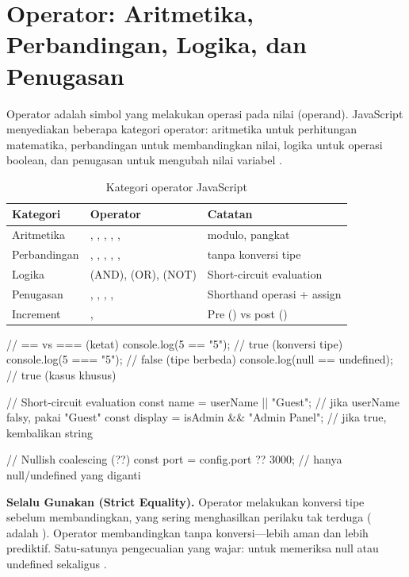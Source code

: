 \section{Operator: Aritmetika, Perbandingan, Logika, dan Penugasan}

Operator adalah simbol yang melakukan operasi pada nilai (operand). JavaScript menyediakan beberapa kategori operator: aritmetika untuk perhitungan matematika, perbandingan untuk membandingkan nilai, logika untuk operasi boolean, dan penugasan untuk mengubah nilai variabel \cite{jsInfo}.

\begin{table}[htbp]
\centering
\begin{tabular}{|P{2.5cm}|P{4.5cm}|P{5cm}|}
\hline
\textbf{Kategori} & \textbf{Operator} & \textbf{Catatan} \\
\hline
Aritmetika & \code{+}, \code{-}, \code{*}, \code{/}, \code{\%}, \code{**} & \code{\%} modulo, \code{**} pangkat \\
\hline
Perbandingan & \code{==}, \code{===}, \code{!=}, \code{!==}, \code{<}, \code{>} & \code{===} tanpa konversi tipe \\
\hline
Logika & \code{\&\&} (AND), \code{||} (OR), \code{!} (NOT) & Short-circuit evaluation \\
\hline
Penugasan & \code{=}, \code{+=}, \code{-=}, \code{*=}, \code{/=} & Shorthand operasi + assign \\
\hline
Increment & \code{++}, \code{--} & Pre () vs post () \\
\hline
\end{tabular}
\caption{Kategori operator JavaScript}
\end{table}

\begin{webcode}[language=JavaScript, caption={Operator perbandingan dan logika}]
// == vs === (ketat)
console.log(5 == "5");    // true  (konversi tipe)
console.log(5 === "5");   // false (tipe berbeda)
console.log(null == undefined); // true (kasus khusus)

// Short-circuit evaluation
const name = userName || "Guest"; // jika userName falsy, pakai "Guest"
const display = isAdmin && "Admin Panel"; // jika true, kembalikan string

// Nullish coalescing (??)
const port = config.port ?? 3000; // hanya null/undefined yang diganti
\end{webcode}

\begin{konsep}
\textbf{Selalu Gunakan \code{===} (Strict Equality).} Operator \code{==} melakukan konversi tipe sebelum membandingkan, yang sering menghasilkan perilaku tak terduga ( adalah ). Operator \code{===} membandingkan tanpa konversi---lebih aman dan lebih prediktif. Satu-satunya pengecualian yang wajar:  untuk memeriksa null atau undefined sekaligus \cite{mdnJsGuide}.
\end{konsep}

